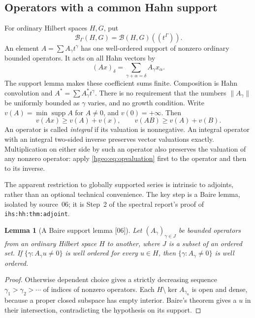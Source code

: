 \documentclass[11pt,letterpaper]{article}
\numberwithin{equation}{section}
\newtheorem{lemma}[lemma]{Lemma}
\theoremstyle{definition}
\theoremstyle{remark}
\newcommand{\BB}[2]{\mathscr B_\Gamma(#1,#2)}
\newcommand{\supp}{\operatorname{supp}}
\newcommand{\norm}[1]{\lVert #1\rVert}
\newcommand{\src}[1]{\textup{\textsf{\small[#1]}}}
\newcommand{\replabel}[1]{\nolinkurl{#1}}
\begin{document}
\subsection{Operators with a common Hahn support}
For ordinary Hilbert spaces $H,G$, put
\[
 \BB{H}{G}=\mathcal B(H,G)((t^\Gamma)).
\]
An element $A=\sum A_\gamma t^\gamma$ has one well-ordered support of
nonzero ordinary bounded operators. It acts on all Hahn vectors by
\[
 (Ax)_\delta=\sum_{\gamma+\alpha=\delta}A_\gamma x_\alpha.
\]
The support lemma makes these coefficient sums finite. Composition is
Hahn convolution and
$A^*=\sum A_\gamma^*t^\gamma$. There is no requirement that the numbers
$\norm{A_\gamma}$ be uniformly bounded as $\gamma$ varies, and no growth
condition. Write $v(A)=\min\supp A$ for $A\ne0$, and $v(0)=+\infty$.
Then
\begin{equation}\label{hgeo:eq:opvaluation}
 v(Ax)\ge v(A)+v(x),\qquad v(AB)\ge v(A)+v(B).
\end{equation}
An operator is called \emph{integral} if its valuation is nonnegative.
An integral operator with an integral two-sided inverse preserves vector
valuations exactly. Multiplication on either side by such an operator
also preserves the valuation of any nonzero operator: apply
\eqref{hgeo:eq:opvaluation} first to the operator and then to its inverse.

The apparent restriction to globally supported series is intrinsic to
adjoints, rather than an optional technical convenience. The key step is a
Baire lemma, isolated by source~06; it is Step~2 of the spectral report's
proof of \replabel{ihs:hh:thm:adjoint}.

\begin{lemma}[A Baire support lemma \src{06}]\label{hgeo:lem:baire}
Let $(A_\gamma)_{\gamma\in J}$ be bounded operators from an ordinary
Hilbert space $H$ to another, where $J$ is a subset of an ordered set. If
$\{\gamma:A_\gamma u\ne0\}$ is well ordered for every $u\in H$, then
$\{\gamma:A_\gamma\ne0\}$ is well ordered.
\end{lemma}
\begin{proof}
Otherwise dependent choice gives a strictly decreasing sequence
$\gamma_1>\gamma_2>\cdots$ of indices of nonzero operators. Each
$H\setminus\ker A_{\gamma_n}$ is open and dense, because a proper closed
subspace has empty interior. Baire's theorem gives a $u$ in their
intersection, contradicting the hypothesis on its support.
\end{proof}
\end{document}
